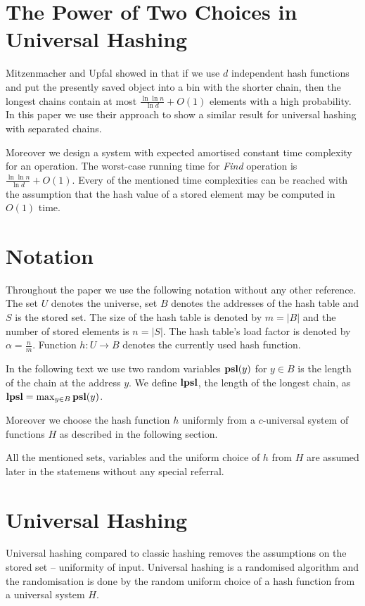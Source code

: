 \section{The Power of Two Choices in Universal Hashing}

Mitzenmacher and Upfal showed in \cite{1076315} that if we use $d$ independent hash functions and put the presently saved object into a bin with the shorter chain, then the longest chains contain at most $\frac{\ln \ln n}{\ln d} + O(1)$ elements with a high probability. In this paper we use their approach to show a similar result for universal hashing with separated chains.

Moreover we design a system with expected amortised constant time complexity for an operation. The worst-case running time for \emph{Find} operation is $\frac{\ln \ln n}{\ln d} + O(1)$. Every of the mentioned time complexities can be reached with the assumption that the hash value of a stored element may be computed in $O(1)$ time.

\section{Notation}
Throughout the paper we use the following notation without any other reference. The set $U$ denotes the universe, set $B$ denotes the addresses of the hash table and $S$ is the stored set. The size of the hash table is denoted by $m = |B|$ and the number of stored elements is $n = |S|$. The hash table's load factor is denoted by $\alpha = \frac{n}{m}$. Function $h: U \rightarrow B$ denotes the currently used hash function.

In the following text we use two random variables $\mathbf{psl}(y)$ for $y \in B$ is the length of the chain at the address $y$. We define $\mathbf{lpsl}$, the length of the longest chain, as $\mathbf{lpsl} = \max_{y \in B} \mathbf{psl}(y)$. 

Moreover we choose the hash function $h$ uniformly from a $c$-universal system of functions $H$ as described in the following section. 

All the mentioned sets, variables and the uniform choice of $h$ from $H$ are assumed later in the statemens without any special referral.

\section{Universal Hashing}
Universal hashing compared to classic hashing removes the assumptions on the stored set -- uniformity of input. Universal hashing is a randomised algorithm and the randomisation is done by the random uniform choice of a hash function from a universal system $H$. 

